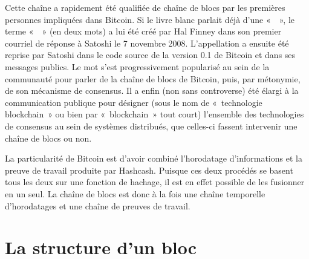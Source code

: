 Cette chaîne a rapidement été qualifiée de chaîne de blocs par les premières personnes impliquées dans Bitcoin. Si le livre blanc parlait déjà d'une «~~», le terme «~~» (en deux mots) a lui été créé par Hal Finney dans son premier courriel de réponse à Satoshi le 7 novembre 2008. L'appellation a ensuite été reprise par Satoshi dans le code source de la version 0.1 de Bitcoin et dans ses messages publics. Le mot  s'est progressivement popularisé au sein de la communauté pour parler de la chaîne de blocs de Bitcoin, puis, par métonymie, de son mécanisme de consensus. Il a enfin (non sans controverse) été élargi à la communication publique pour désigner (sous le nom de «~technologie blockchain~» ou bien par «~blockchain~» tout court) l'ensemble des technologies de consensus au sein de systèmes distribués, que celles-ci fassent intervenir une chaîne de blocs ou non.

La particularité de Bitcoin est d'avoir combiné l'horodatage d'informations et la preuve de travail produite par Hashcash. Puisque ces deux procédés se basent tous les deux sur une fonction de hachage, il est en effet possible de les fusionner en un seul. La chaîne de blocs est donc à la fois une chaîne temporelle d'horodatages et une chaîne de preuves de travail.

\section*{La structure d'un bloc} %


